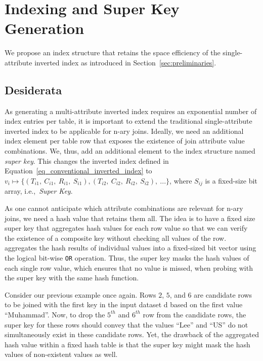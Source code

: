 
\section{Indexing and Super Key Generation}\label{sec:index}
We propose an index structure that retains the space efficiency of the single-attribute inverted index as introduced in Section~\ref{sec:preliminaries}.

% 

\subsection{Desiderata}
\label{sec:desiderata}
As generating a multi-attribute inverted index requires an exponential number of index entries per table,
it is important to extend the traditional single-attribute inverted index to be applicable for n-ary joins.
Ideally, we need an additional index element per table row that exposes the existence of join attribute value combinations.
We, thus, add an additional element to the index structure named \textit{super key}. This changes the inverted index defined in Equation~\ref{eq_conventional_inverted_index} to $v_i \mapsto \{(T_{i1},\ C_{i1},\ R_{i1},\ S_{i1}), (T_{i2},\ C_{i2},\ R_{i2},\ S_{i2}),\ ... \}$, where $S_{ij}$ is a fixed-size bit array, i.e.,~\textit{Super Key}.

As one cannot anticipate which attribute combinations are relevant for n-ary joins, we need a hash value that retains them all.
The idea is to have a fixed size super key that aggregates hash values for each row value so that we can verify the existence of a composite key without checking all values of the row.
\system aggregates the hash results of individual values into a fixed-sized bit vector using the logical bit-wise \texttt{OR} operation. Thus, the super key masks the hash values of each single row value, which ensures that no value is missed, when probing with the super key with the same hash function.



Consider our previous example once again. Rows $2$, $5$, and $6$ are candidate rows to be joined with the first key in the input dataset d based on the first value ``Muhammad''. Now, to drop the $5^{th}$ and $6^{th}$ row from the candidate rows, the super key for these rows should convey that the values ``Lee'' and ``US'' do not simultaneously exist in these candidate rows.
Yet, the drawback of the aggregated hash value within a fixed hash table is that the super key might mask the hash values of non-existent values as well.

